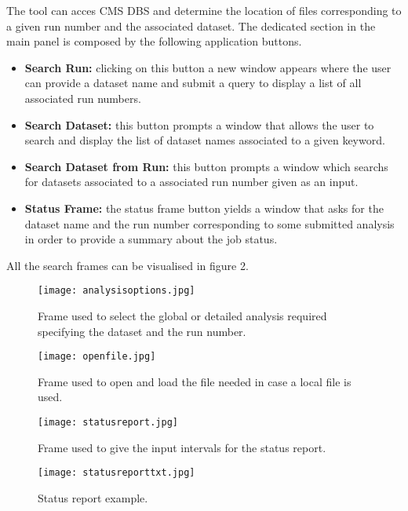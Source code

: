 \documentclass[11pt]{amsart}
\begin{document}
The tool can acces CMS DBS and determine the location of files corresponding to a given run number and the associated dataset. The dedicated section in the main panel is composed by the following application buttons.
\begin{itemize}
\item \textbf{Search Run:} clicking on this button a new window appears where the user can provide a dataset name and submit a query to display a list of all associated run numbers.\\
\item \textbf{Search Dataset:}  this button prompts a window that allows the user to search and display the list of dataset names associated to a given  keyword.\\
\item \textbf{Search Dataset from Run:} this button prompts a window which searchs for datasets associated to a associated run number given as an input.\\
\item \textbf{Status Frame:} the status frame button yields a window that asks for the dataset name and the run number corresponding to some submitted analysis in order to provide a summary about the job status.\\
\end{itemize}
All the search frames can be visualised in figure 2.
\begin{figure}[htb] %
   \centering
   \texttt{[image: analysisoptions.jpg]} 
   \caption{Frame used to select the global or detailed analysis required specifying the dataset and the run number.}
   \label{fig:analoptions}
\end{figure}
\begin{figure}[htb] %
   \centering
   \texttt{[image: openfile.jpg]} 
   \caption{Frame used to open and load the file needed in case a local file is used.}
   \label{fig:openfile}
\end{figure}
\begin{figure}[htb] %
   \centering
   \texttt{[image: statusreport.jpg]} 
   \caption{Frame used to give the input intervals for the status report.}
   \label{fig:statusreport}
\end{figure}
\begin{figure}[htb] %
   \centering
   \texttt{[image: statusreporttxt.jpg]} 
   \caption{Status report example.}
   \label{fig:statustxt}
\end{figure}
\end{document}
